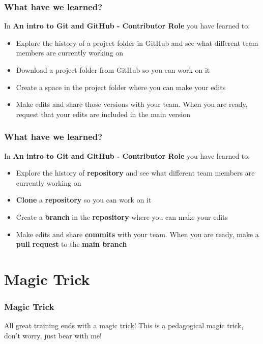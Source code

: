 \documentclass[aspectratio=169]{beamer} %
\begin{document}
\begin{frame}
\frametitle{What have we learned?}

	In \textbf{An intro to Git and GitHub - Contributor Role} you have learned to:

	\begin{itemize}
		\item Explore the history of a project folder in GitHub and see what different team members are currently working on
		\item Download a project folder from GitHub so you can work on it
		\item Create a space in the project folder where you can make your edits
		\item Make edits and share those versions with your team. When you are ready, request that your edits are included in the main version
	\end{itemize}

\end{frame}

\begin{frame}
\frametitle{What have we learned?}

	In \textbf{An intro to Git and GitHub - Contributor Role} you have learned to:

	\begin{itemize}
		\item Explore the history of \textbf{repository} and see what different team members are currently working on
		\item \textbf{Clone} a \textbf{repository} so you can work on it
		\item Create a \textbf{branch} in the \textbf{repository} where you can make your edits
		\item Make edits and share \textbf{commits} with your team. When you are ready, make a \textbf{pull request} to the \textbf{main branch}
	\end{itemize}
\end{frame}

\section{Magic Trick}


\begin{frame}
\frametitle{Magic Trick}

	All great training ends with a magic trick! This is a pedagogical magic trick, don't worry, just bear with me!

	\vspace{1cm}


	\vspace{1cm}

\end{frame}
\end{document}
